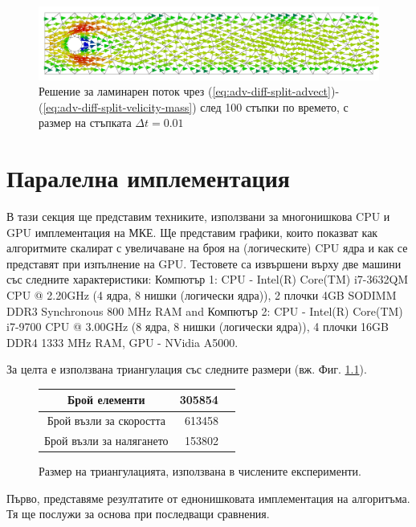 \documentclass[12pt]{report}
\begin{document}
\begin{figure}[H]
\centering
\includegraphics[width=\textwidth]{Figures/01_introduction/P2P1_adv_diff_100.pdf}
\caption{Решение за ламинарен поток чрез (\ref{eq:adv-diff-split-advect})-(\ref{eq:adv-diff-split-velicity-mass}) след 100 стъпки по времето, с размер на стъпката $\Delta t = 0.01$} \label{fig:advection-diffusion-plot}
\end{figure}

\chapter{Паралелна имплементация}\label{ch:FEM-Parallel}
В тази секция ще представим техниките, използвани за многонишкова CPU и GPU имплементация на МКЕ. Ще представим графики, които показват как алгоритмите скалират с увеличаване на броя на (логическите) CPU ядра и как се представят при изпълнение на GPU. Тестовете са извършени върху две машини със следните характеристики: Компютър 1: CPU - Intel(R) Core(TM) i7-3632QM CPU @ 2.20GHz (4 ядра, 8 нишки (логически ядра)), 2 плочки 4GB SODIMM DDR3 Synchronous 800 MHz RAM and Компютър 2: CPU - Intel(R) Core(TM) i7-9700 CPU @ 3.00GHz (8 ядра, 8 нишки (логически ядра)), 4 плочки 16GB DDR4 1333 MHz RAM, GPU - NVidia A5000.

За целта е използвана триангулация със следните размери (вж. Фиг. \ref{tab:mesh_size}).
\begin{figure}[H]
\centering
\begin{tabular}{|c|r|r|}
\hline
Брой елементи               & 305854                      \\ \hline
Брой възли за скоростта        & 613458                      \\ \hline
Брой възли за налягането         & 153802                      \\ \hline
\end{tabular}\caption{Размер на триангулацията, използвана в числените експерименти.}\label{tab:mesh_size}
\end{figure}

Първо, представяме резултатите от еднонишковата имплементация на алгоритъма. Тя ще послужи за основа при последващи сравнения.
\end{document}
